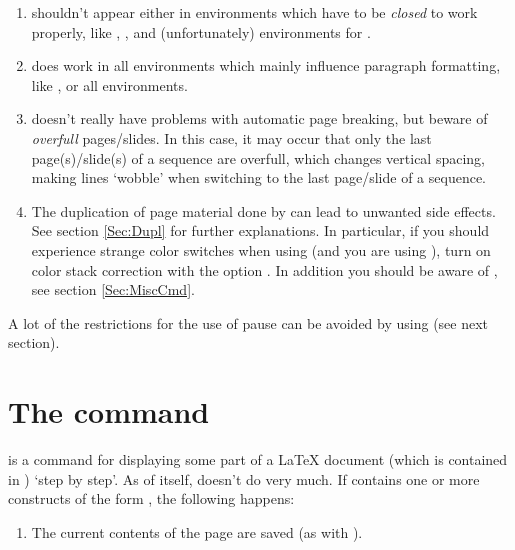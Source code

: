 \begin{slide}
\begin{enumerate}
  \item {} shouldn't appear either in environments which have to be \emph{closed} to work properly, like
    , , and (unfortunately) environments for .

  \item {} does work in all environments which mainly influence paragraph formatting, like ,
     or all  environments.

    \newslide

  \item {} doesn't really have problems with automatic page breaking, but beware of \emph{overfull}
    pages/slides. In this case, it may occur that only the last page(s)/slide(s) of a sequence are overfull, which
    changes vertical spacing, making lines `wobble' when switching to the last page/slide of a sequence.

    \newslide

  \item The duplication of page material done by  can lead to unwanted side effects. See section
    \ref{Sec:Dupl} for further explanations. In particular, if you should experience strange color switches when using
     (and you are  using ), turn on color stack correction with the option
    . In addition you should be aware of , see section
    \ref{Sec:MiscCmd}.

  \end{enumerate}

  A lot of the restrictions for the use of pause can be avoided by using  (see next section).

  \newslide

  \section{The  command}
   is a command for displaying some part of a \LaTeX{} document (which
  is contained in ) `step by step'. As of itself,  doesn't do very much. If
   contains one or more constructs of the form , the
  following happens:
  \begin{enumerate}
  \item The current contents of the page are saved (as with ).


\end{enumerate}
\end{slide}

